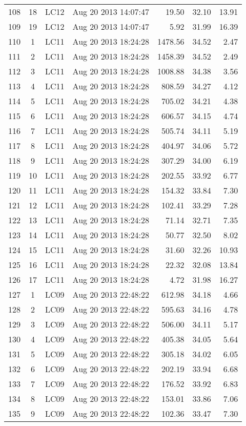 \documentclass{article}
\begin{document}
\begin{longtable}{ccllrrr}
108&18&LC12&Aug 20 2013 14:07:47&19.50&32.10&13.91\\
109&19&LC12&Aug 20 2013 14:07:47&5.92&31.99&16.39\\
\hline 
110&1&LC11&Aug 20 2013 18:24:28&1478.56&34.52&2.47\\
111&2&LC11&Aug 20 2013 18:24:28&1458.39&34.52&2.49\\
112&3&LC11&Aug 20 2013 18:24:28&1008.88&34.38&3.56\\
113&4&LC11&Aug 20 2013 18:24:28&808.59&34.27&4.12\\
114&5&LC11&Aug 20 2013 18:24:28&705.02&34.21&4.38\\
115&6&LC11&Aug 20 2013 18:24:28&606.57&34.15&4.74\\
116&7&LC11&Aug 20 2013 18:24:28&505.74&34.11&5.19\\
117&8&LC11&Aug 20 2013 18:24:28&404.97&34.06&5.72\\
118&9&LC11&Aug 20 2013 18:24:28&307.29&34.00&6.19\\
119&10&LC11&Aug 20 2013 18:24:28&202.55&33.92&6.77\\
120&11&LC11&Aug 20 2013 18:24:28&154.32&33.84&7.30\\
121&12&LC11&Aug 20 2013 18:24:28&102.41&33.29&7.28\\
122&13&LC11&Aug 20 2013 18:24:28&71.14&32.71&7.35\\
123&14&LC11&Aug 20 2013 18:24:28&50.77&32.50&8.02\\
124&15&LC11&Aug 20 2013 18:24:28&31.60&32.26&10.93\\
125&16&LC11&Aug 20 2013 18:24:28&22.32&32.08&13.84\\
126&17&LC11&Aug 20 2013 18:24:28&4.72&31.98&16.27\\
\hline 
127&1&LC09&Aug 20 2013 22:48:22&612.98&34.18&4.66\\
128&2&LC09&Aug 20 2013 22:48:22&595.63&34.16&4.78\\
129&3&LC09&Aug 20 2013 22:48:22&506.00&34.11&5.17\\
130&4&LC09&Aug 20 2013 22:48:22&405.38&34.05&5.64\\
131&5&LC09&Aug 20 2013 22:48:22&305.18&34.02&6.05\\
132&6&LC09&Aug 20 2013 22:48:22&202.19&33.94&6.68\\
133&7&LC09&Aug 20 2013 22:48:22&176.52&33.92&6.83\\
134&8&LC09&Aug 20 2013 22:48:22&153.01&33.86&7.06\\
135&9&LC09&Aug 20 2013 22:48:22&102.36&33.47&7.30\\

\end{longtable}
\end{document}
